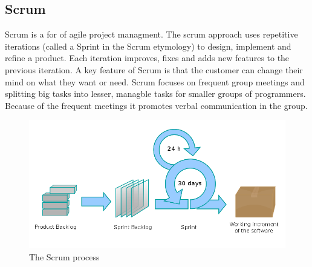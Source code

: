 \subsection{Scrum}
Scrum is a for of agile project managment. The scrum approach uses  repetitive iterations (called 
a Sprint in the Scrum etymology) to design, implement and refine a product. Each iteration improves,
fixes and adds new features to the previous iteration. A key feature of Scrum is that the customer
can change their mind on what they want or need. Scrum focuses on frequent group meetings and
splitting big tasks into lesser, managble tasks for smaller groups of programmers. Because of the
frequent meetings it promotes verbal communication in the group.
\begin{figure}[h!]
\centering \includegraphics[scale=0.4]{img/designmodel-scrum} \caption{The Scrum process}
\label{fig:desigmodel-scrum}
\end{figure}

